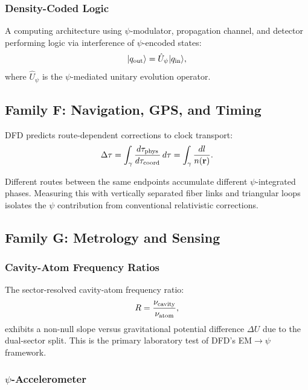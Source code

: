 \documentclass[aps,prd,twocolumn,superscriptaddress,floatfix,nofootinbib]{revtex4-2}
\begin{document}
\subsubsection{Density-Coded Logic}

A computing architecture using $\psi$-modulator, propagation channel,
and detector performing logic via interference of $\psi$-encoded states:
\begin{equation}
|q_{\rm out}\rangle = \hat{U}_\psi|q_{\rm in}\rangle,
\end{equation}
where $\hat{U}_\psi$ is the $\psi$-mediated unitary evolution operator.

\subsection{Family F: Navigation, GPS, and Timing}

DFD predicts route-dependent corrections to clock transport:
\begin{equation}
\Delta\tau = \int_{\gamma}\frac{d\tau_{\rm phys}}{d\tau_{\rm coord}}\,d\tau
= \int_\gamma \frac{dl}{n(\mathbf{r})}.
\end{equation}

Different routes between the same endpoints accumulate different
$\psi$-integrated phases. Measuring this with vertically separated
fiber links and triangular loops isolates the $\psi$ contribution from
conventional relativistic corrections.

\subsection{Family G: Metrology and Sensing}

\subsubsection{Cavity-Atom Frequency Ratios}

The sector-resolved cavity-atom frequency ratio:
\begin{equation}
R = \frac{\nu_{\rm cavity}}{\nu_{\rm atom}},
\end{equation}
exhibits a non-null slope versus gravitational potential difference
$\Delta U$ due to the dual-sector split. This is the primary laboratory
test of DFD's EM$\to\psi$ framework.

\subsubsection{$\psi$-Accelerometer}
\end{document}

